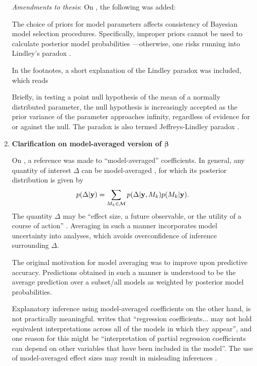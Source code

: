 \documentclass[11pt,openright,twoside]{report}
\begin{document}
\begin{enumerate}
  \textit{Amendments to thesis}: On , the following was added:
  
\begin{displayquote}
The choice of priors for model parameters affects consistency of Bayesian model selection procedures. 
Specifically, improper priors cannot be used to calculate posterior model probabilities \citep{casella2009consistency} ---otherwise, one risks running into Lindley's paradox \citep{lindley1957statistical}.
\end{displayquote} 

  In the footnotes, a short explanation of the Lindley paradox was included, which reads

\begin{displayquote}
Briefly, in testing a point null hypothesis of the mean of a normally distributed parameter, the null hypothesis is increasingly accepted as the prior variance of the parameter approaches infinity, regardless of evidence for or against the null.
The paradox is also termed Jeffreys-Lindley paradox \citep{robert2014jeffreys}.
\end{displayquote} 
  
    
  \item \textbf{Clarification on model-averaged version of $\boldsymbol\beta$}

  On , a reference was made to ``model-averaged'' coefficients.
  In general, any quantity of interest $\Delta$ can be model-averaged \citep{madigan1994model}, for which its posterior distribution is given by
  \begin{equation}
    p(\Delta|{\mathbf y}) = \sum_{M_k \in {\mathcal M}} p(\Delta|{\mathbf y},M_k) p(M_k|{\mathbf y}).
  \end{equation}
  The quantity $\Delta$ may be ``effect size, a future observable, or the utility of a course of action'' \citep{madigan1994model, hoeting1999bayesian}.
  Averaging in such a manner incorporates model uncertainty into analyses, which avoids overconfidence of inference surrounding $\Delta$.

  The original motivation for model averaging was to improve upon predictive accuracy.
  Predictions obtained in such a manner is understood to be the average prediction over a subset/all models as weighted by posterior model probabilities.
  
  Explanatory inference using model-averaged coefficients on the other hand, is not practically meaningful.
  \citet{banner2017considerations} writes that ``regression coefficients... may not hold equivalent interpretations across all of the models in which they appear'', and one reason for this might be ``interpretation of partial regression coefficients can depend on other variables that have been included in the model''.
  The use of model-averaged effect sizes may result in misleading inferences \citep{cade2015model}.
  

\end{enumerate}
\end{document}
